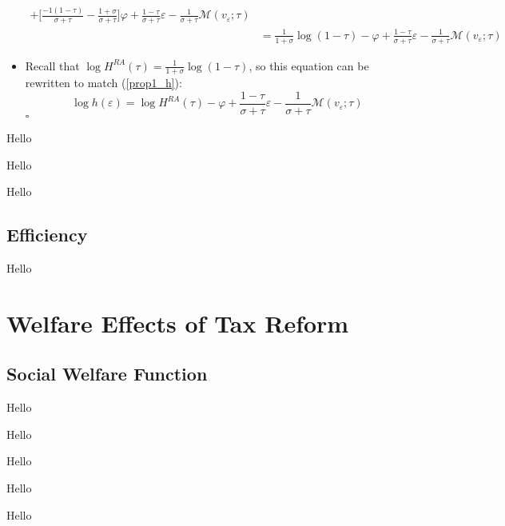 \documentclass{article}
\newcommand{\M}{\mathcal{M}}
\begin{document}
\begin{itemize}
\begin{align*}
+ \Bigg[\frac{-1(1-\tau)}{\sigma+\tau} -\frac{1+\sigma}{\sigma+\tau} \Bigg] \varphi
+ \frac{1-\tau}{\sigma+\tau} \varepsilon
- \frac{1}{\sigma+\tau} \M ( v_\varepsilon; \tau)\\
&=  \frac{1}{1+\sigma} \log (1-\tau) - \varphi
+ \frac{1-\tau}{\sigma+\tau} \varepsilon
- \frac{1}{\sigma+\tau} \M ( v_\varepsilon; \tau)
\end{align*}
\item Recall that $\log H^{RA}(\tau) = \frac{1}{1 + \sigma} \log ( 1 - \tau)$, so this equation can be rewritten to match (\ref{prop1_h}):
$$
\log h(\varepsilon) 
=  \log H^{RA}(\tau) - \varphi
+ \frac{1-\tau}{\sigma+\tau} \varepsilon
- \frac{1}{\sigma+\tau} \M ( v_\varepsilon; \tau)
$$
$\square$

\end{itemize}

{
\proposition Hello

}

{
\corollary Hello

}

{
\corollary Hello

}

\subsection{Efficiency}

{
\proposition Hello

}

\section{Welfare Effects of Tax Reform}



\subsection{Social Welfare Function}



{
\proposition Hello

}

{
\corollary Hello

}

{
\corollary Hello

}

{
\corollary Hello

}

{
\corollary Hello

}
\end{document}
